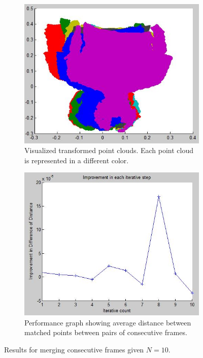 \documentclass[11pt]{article}
\begin{document}
\begin{figure}[h] \centering
	\begin{subfigure}{.5\textwidth} 
		\includegraphics[width=.9\textwidth]{img/consecutive_10.jpg}
		\caption{Visualized transformed point clouds. Each point cloud is represented in a different color.}
		\label{fig:consecutive_10}
	\end{subfigure}%
	\begin{subfigure}{.5\textwidth} 
		\includegraphics[width=.9\textwidth]{img/consecutive_10_performance.jpg}
		\caption{Performance graph showing average distance between matched points between pairs of consecutive frames.}
		\label{fig:consecutive_10_performance}
	\end{subfigure}
	\caption{Results for merging consecutive frames given $N = 10$.}
\end{figure}
\end{document}
